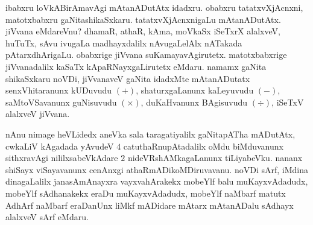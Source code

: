 \medskip

ibabxru loVkABirAmavAgi mAtanADutAtx idadxru. obabxru tatatxvXjAcnxni, matotxbabxru gaNitashikaSxkaru. tatatxvXjAcnxnigaLu mAtanADutAtx. jiVvana eMdareVnu? dhamaR, athaR, kAma, moVkaSx iSeTxrX alalxveV, huTuTx, sAvu ivugaLa madhayxdalilx nAvugaLelAlx nATakada pAtarxdhArigaLu. obabxrige jiVvana suKamayavAgirutetx. matotxbabxrige jiVvanadalilx kaSaTx kApaRNayxgaLirutetx eMdaru. namamx gaNita shikaSxkaru noVDi, jiVvanaveV gaNita idadxMte mAtanADutatx senxVhitaranunx kUDuvudu $(+)$, shaturxgaLanunx kaLeyuvudu $(-)$, saMtoVSavanunx guNisuvudu $(\times)$, duKaHvanunx BAgisuvudu $(\div)$, iSeTxV alalxveV jiVvana.

\medskip

nAnu nimage heVLidedx aneVka sala taragatiyalilx gaNitapATha mADutAtx, cwkaLiV kAgadada yAvudeV $4$ catuthaRnupAtadalilx oMdu biMduvanunx sithxravAgi nililxsabeVkAdare $2$ nideVRshAMkagaLanunx tiLiyabeVku. nananx shiSayx viSayavanunx cenAnxgi athaRmADikoMDiruvavanu. noVDi sArf, iMdina dinagaLalilx janasAmAnayxra vayxvahArakekx mobeYlf balu muKayxvAdadudx, mobeYlf sAdhanakekx eraDu muKayxvAdadudx, mobeYlf naMbarf matutx AdhArf naMbarf eraDanUnx liMkf mADidare mAtarx mAtanADalu sAdhayx alalxveV sArf eMdaru.


